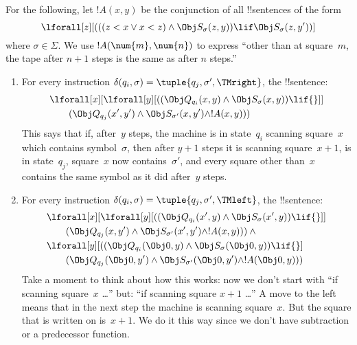 \documentclass[../../../include/open-logic-section]{subfiles}
\begin{document}
\begin{enumerate}
For the following, let $!A(x, y)$ be the conjunction of all !!{sentence}s
of the form
\[
\lforall[z][
  (((z < x \lor x < z) \land \Obj S_\sigma(z, y))
  \lif \Obj S_\sigma(z, y'))]
\]
where $\sigma \in \Sigma$.  We use $!A(\num{m},\num{n})$ to express
``other than at square~$m$, the tape after $n+1$ steps is the same as
after $n$ steps.''
\begin{enumerate}
\item {} For every instruction $\delta(q_i, \sigma) =
  \tuple{q_j, \sigma', \TMright}$, the !!{sentence}:
\begin{align*}
& \lforall[x][\lforall[y][(
   (\Obj Q_{q_i}(x, y) \land \Obj S_{\sigma}(x, y)) \lif {}]] \\
&\qquad   (\Obj Q_{q_j}(x', y') \land \Obj S_{\sigma'}(x, y') \land
!A(x, y)))
\end{align*}
This says that if, after~$y$ steps, the machine is in state~$q_i$
scanning square~$x$ which contains symbol~$\sigma$, then after $y+1$
steps it is scanning square~$x+1$, is in state~$q_j$, square~$x$ now
contains~$\sigma'$, and every square other than~$x$ contains the
same symbol as it did after~$y$ steps.

\item {} For every instruction $\delta(q_i, \sigma) =
  \tuple{q_j, \sigma', \TMleft}$, the !!{sentence}:
\begin{align*}
& \lforall[x][\lforall[y][
    ((\Obj Q_{q_i}(x', y) \land \Obj S_{\sigma}(x', y)) \lif {}]]\\
& \qquad   (\Obj Q_{q_j}(x, y') \land \Obj S_{\sigma'}(x', y') \land
!A(x, y))) \land {}\\
& \lforall[y][((\Obj Q_{q_i}(\Obj 0, y) \land \Obj S_{\sigma}(\Obj 0,
    y)) \lif {}]\\
& \qquad (\Obj Q_{q_j}(\Obj 0, y') \land \Obj S_{\sigma'}(\Obj 0,
  y') \land !A(\Obj 0, y)))
\end{align*}
Take a moment to think about how this works: now we don't start with
``if scanning square~$x$ \dots'' but: ``if scanning square $x+1$
\dots'' A move to the left means that in the next step the machine is
scanning square~$x$.  But the square that is written on is~$x+1$.  We
do it this way since we don't have subtraction or a predecessor
function.


\end{enumerate}
\end{enumerate}
\end{document}
